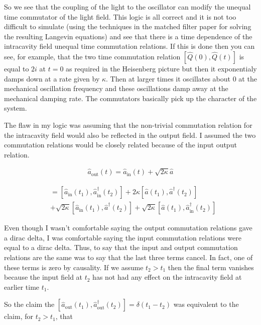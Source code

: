 \documentclass[12pt]{article}
\begin{document}
So we see that the coupling of the light to the oscillator can modify the unequal time commutator of the light field.
This logic is all correct and it is not too difficult to simulate (using the techniques in the matched filter paper for solving the resulting Langevin equations) and see that there is a time dependence of the intracavity field unequal time commutation relations. If this is done then you can see, for example, that the two time commutation relation $[\hat{Q}(0),\hat{Q}(t)]$ is equal to $2i$ at $t=0$ as required in the Heisenberg picture but then it exponentialy damps down at a rate given by $\kappa$. Then at larger times it oscillates about $0$ at the mechanical oscillation frequency and these oscillations damp away at the mechanical damping rate. The commutators basically pick up the character of the system. 

The flaw in my logic was assuming that the non-trivial commutation relation for the intracavity field would also be reflected in the output field. I assumed the two commutation relations would be closely related because of the input output relation.

\begin{align}
\hat{a}_{\text{out}}(t) = \hat{a}_{\text{in}}(t) + \sqrt{2\kappa} \hat{a}
\end{align}

\begin{align}
[\hat{a}_{\text{out}}(t_1),\hat{a}_{\text{out}}^{\dag}(t_2)] &= [\hat{a}_{\text{in}}(t_1),\hat{a}_{\text{in}}^{\dag}(t_2)] + 2\kappa [\hat{a}(t_1),\hat{a}^{\dag}(t_2)]\\
&+ \sqrt{2\kappa}[\hat{a}_{\text{in}}(t_1),\hat{a}^{\dag}(t_2)] + \sqrt{2\kappa}[\hat{a}(t_1),\hat{a}_{\text{in}}^{\dag}(t_2)]
\end{align}

Even though I wasn't comfortable saying the output commutation relations gave a dirac delta, I was comfortable saying the input commutation relations were equal to a dirac delta. Thus, to say that the input and output commutation relations are the same was to say that the last three terms cancel. In fact, one of these terms is zero by causality. If we assume $t_2>t_1$ then the final term vanishes because the input field at $t_2$ has not had any effect on the intracavity field at earlier time $t_1$.

So the claim the $[\hat{a}_{\text{out}}(t_1),\hat{a}_{\text{out}}^{\dag}(t_2)] = \delta(t_1-t_2)$ was equivalent to the claim, for $t_2>t_1$, that
\end{document}
